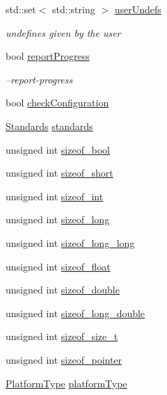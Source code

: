 \begin{DoxyCompactItemize}
std\-::set$<$ std\-::string $>$ \hyperlink{class_settings_a010d28fdcfcb50e46fc7de37086da957}{user\-Undefs}
\begin{DoxyCompactList}\small\item\em undefines given by the user \end{DoxyCompactList}\item 
bool \hyperlink{class_settings_a4b8992ce101fd7bb4e8cec8203b51a5b}{report\-Progress}
\begin{DoxyCompactList}\small\item\em --report-\/progress \end{DoxyCompactList}\item 
bool \hyperlink{class_settings_a56346f5b3dd9313608b3b9b7b4310e60}{check\-Configuration}
\item 
\hyperlink{struct_standards}{Standards} \hyperlink{class_settings_affed1d4355e85d3c4abb1364964e2ff5}{standards}
\item 
unsigned int \hyperlink{class_settings_a9360678fb9ab1207238f2bc2577b9ed7}{sizeof\-\_\-bool}
\item 
unsigned int \hyperlink{class_settings_a864bcb7744b825b0d0fd247087352203}{sizeof\-\_\-short}
\item 
unsigned int \hyperlink{class_settings_a89ab35c2d7d0b23391e94d70e53434e0}{sizeof\-\_\-int}
\item 
unsigned int \hyperlink{class_settings_ae7e0edfce174fc9ada72f310fc55ef33}{sizeof\-\_\-long}
\item 
unsigned int \hyperlink{class_settings_ad0e779b70fc21acbf1df5c502f0dd96d}{sizeof\-\_\-long\-\_\-long}
\item 
unsigned int \hyperlink{class_settings_aa94baf211f5c650231bde448e4076219}{sizeof\-\_\-float}
\item 
unsigned int \hyperlink{class_settings_a3ee54db34fd2a8daa1fcc79847160658}{sizeof\-\_\-double}
\item 
unsigned int \hyperlink{class_settings_a99f88aa43c73078ba8024519a5bb3f35}{sizeof\-\_\-long\-\_\-double}
\item 
unsigned int \hyperlink{class_settings_ac94aa8ccd4a48075a750cb4142b04c52}{sizeof\-\_\-size\-\_\-t}
\item 
unsigned int \hyperlink{class_settings_acbd92cfb57a1ebd1b6b3838e863e960d}{sizeof\-\_\-pointer}
\item 
\hyperlink{class_settings_a7c94920f2160a5cf261ce822a0ce2ee8}{Platform\-Type} \hyperlink{class_settings_a6c375855187695c207a7a873185c0d07}{platform\-Type}
\end{DoxyCompactItemize}


